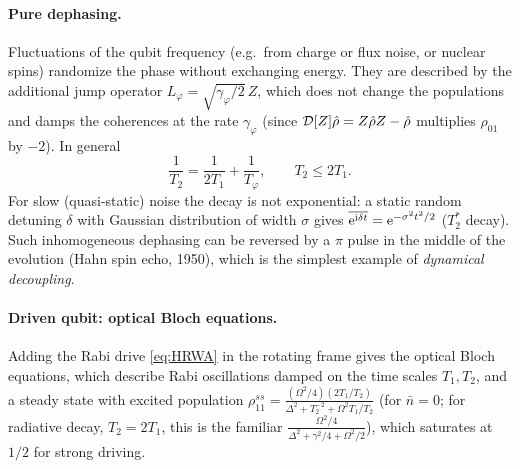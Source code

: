 \paragraph{Pure dephasing.} Fluctuations of the qubit frequency (e.g.\ from charge or flux noise, or nuclear spins) randomize the phase without exchanging energy. They are
described by the additional jump operator $L_\varphi=\sqrt{\gamma_\varphi/2}\,Z$, which does not change the populations and damps the coherences at the rate $\gamma_\varphi$
(since $\mathcal D[Z]\hat\rho=Z\hat\rho Z-\hat\rho$ multiplies $\rho_{01}$ by $-2$). In general
\begin{equation}
  \frac1{T_2}=\frac1{2T_1}+\frac1{T_\varphi},\qquad T_2\le2T_1 .
\end{equation}
For slow (quasi-static) noise the decay is not exponential: a static random detuning $\delta$ with Gaussian distribution of width $\sigma$ gives
$\overline{\mathrm e^{\mathrm i\delta t}}=\mathrm e^{-\sigma^2t^2/2}$ ($T_2^*$ decay). Such inhomogeneous dephasing can be reversed by a $\pi$ pulse in the middle of the evolution (Hahn spin echo,
1950), which is the simplest example of \emph{dynamical decoupling}.

\paragraph{Driven qubit: optical Bloch equations.} Adding the Rabi drive \cref{eq:HRWA} in the rotating frame gives the optical Bloch equations, which describe Rabi oscillations
damped on the time scales $T_1,T_2$, and a steady state with excited population $\rho_{11}^{ss}=\frac{(\Omega^2/4)(2T_1/T_2)}{\Delta^2+T_2^{-2}+\Omega^2T_1/T_2}$ (for $\bar n=0$; for radiative decay, $T_2=2T_1$, this is the familiar $\frac{\Omega^2/4}{\Delta^2+\gamma^2/4+\Omega^2/2}$),
which saturates at $1/2$ for strong driving.

